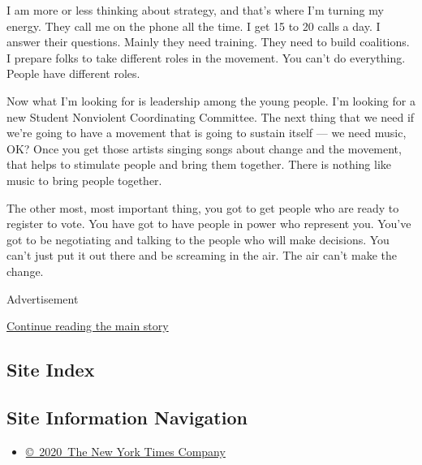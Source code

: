 I am more or less thinking about strategy, and that's where I'm turning
my energy. They call me on the phone all the time. I get 15 to 20 calls
a day. I answer their questions. Mainly they need training. They need to
build coalitions. I prepare folks to take different roles in the
movement. You can't do everything. People have different roles.

Now what I'm looking for is leadership among the young people. I'm
looking for a new Student Nonviolent Coordinating Committee. The next
thing that we need if we're going to have a movement that is going to
sustain itself --- we need music, OK? Once you get those artists singing
songs about change and the movement, that helps to stimulate people and
bring them together. There is nothing like music to bring people
together.

The other most, most important thing, you got to get people who are
ready to register to vote. You have got to have people in power who
represent you. You've got to be negotiating and talking to the people
who will make decisions. You can't just put it out there and be
screaming in the air. The air can't make the change.

Advertisement

\protect\hyperlink{after-bottom}{Continue reading the main story}

\hypertarget{site-index}{%
\subsection{Site Index}\label{site-index}}

\hypertarget{site-information-navigation}{%
\subsection{Site Information
Navigation}\label{site-information-navigation}}

\begin{itemize}
\tightlist
\item
  \href{https://help.nytimes.com/hc/en-us/articles/115014792127-Copyright-notice}{©~2020~The
  New York Times Company}
\end{itemize}

